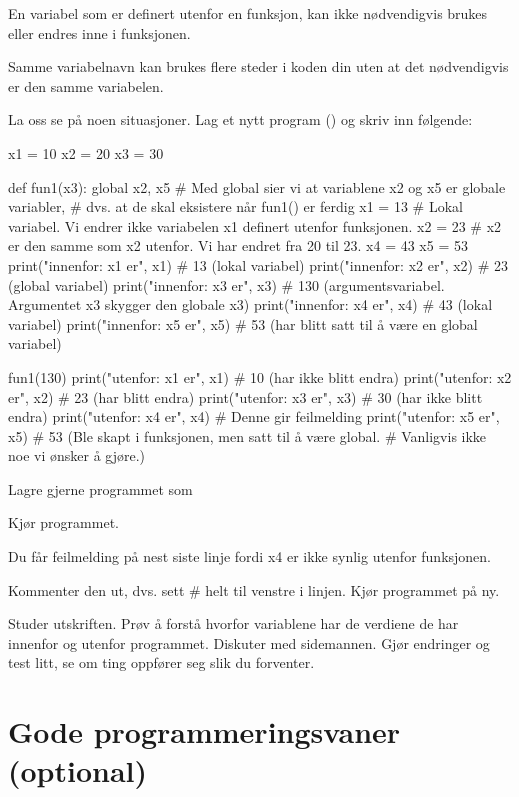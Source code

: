 En variabel som er definert utenfor en funksjon, kan ikke nødvendigvis brukes eller endres inne i funksjonen.

Samme variabelnavn kan brukes flere steder i koden din uten at det nødvendigvis er den samme variabelen.

La oss se på noen situasjoner. Lag et nytt program (\usnsubmenusep{}) og skriv inn følgende:
\begin{usncodebox}
x1 = 10
x2 = 20
x3 = 30

def fun1(x3):
    global x2, x5   # Med global sier vi at variablene x2 og x5 er globale variabler,  
                    # dvs. at de skal eksistere når fun1() er ferdig
    x1 = 13   # Lokal variabel. Vi endrer ikke variabelen x1 definert utenfor funksjonen. 
    x2 = 23   # x2 er den samme som x2 utenfor. Vi har endret fra 20 til 23. 
    x4 = 43
    x5 = 53
    print("innenfor: x1 er", x1)  #  13 (lokal variabel)
    print("innenfor: x2 er", x2)  #  23 (global variabel)
    print("innenfor: x3 er", x3)  # 130 (argumentsvariabel. Argumentet x3 skygger den globale x3)
    print("innenfor: x4 er", x4)  #  43 (lokal variabel)
    print("innenfor: x5 er", x5)  #  53 (har blitt satt til å være en global variabel)

fun1(130)
print("utenfor: x1 er", x1)   # 10 (har ikke blitt endra)
print("utenfor: x2 er", x2)   # 23 (har blitt endra)
print("utenfor: x3 er", x3)   # 30 (har ikke blitt endra)
print("utenfor: x4 er", x4)   # Denne gir feilmelding 
print("utenfor: x5 er", x5)   # 53 (Ble skapt i funksjonen, men satt til å være global. 
                              # Vanligvis ikke noe vi ønsker å gjøre.) 

\end{usncodebox}

Lagre gjerne programmet som 

Kjør programmet.

Du får feilmelding på nest siste linje fordi x4 er ikke synlig utenfor funksjonen. 

Kommenter den ut, dvs. sett \# helt til venstre i linjen. Kjør programmet på ny.

Studer utskriften. Prøv å forstå hvorfor variablene har de verdiene de har innenfor og utenfor programmet. Diskuter med sidemannen. Gjør endringer og test litt, se om ting oppfører seg slik du forventer.

\section{Gode programmeringsvaner (optional)}

